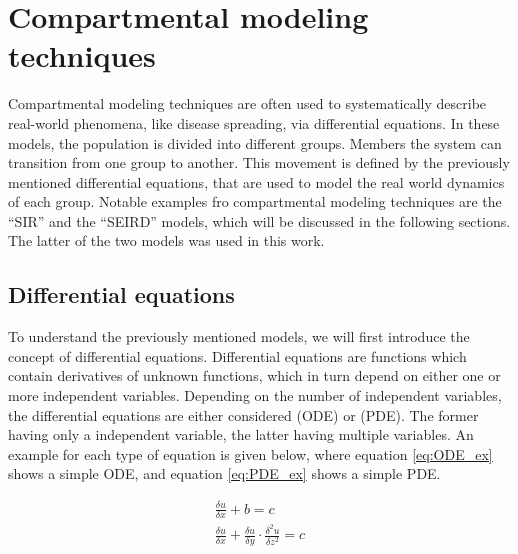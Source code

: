\section{Compartmental modeling techniques}
Compartmental modeling techniques are often used to systematically describe real-world phenomena,
like disease spreading, via differential equations\cite{kermack1991contributions,kendall1956deterministic}. In these models, the population is divided into different groups. 
Members the system can transition from one group to another. This movement is defined by the previously mentioned differential equations, that are used to model the real
world dynamics of each group. Notable examples fro compartmental modeling techniques are the ``SIR'' and the ``SEIRD'' models, which will be discussed in
the following sections. The latter of the two models was used in this work.


\subsection{Differential equations}
To understand the previously mentioned models, we will first introduce the concept of differential equations.
Differential equations are functions which contain derivatives of unknown functions, which in turn depend
on either one or more independent variables. Depending on the number of independent variables, the differential
equations are either considered  (ODE) or
 (PDE). The former having only a independent variable, the latter having multiple variables.
An example for each type of equation is given below, where equation \ref*{eq:ODE_ex} shows a simple ODE, and equation \ref*{eq:PDE_ex} shows a
simple PDE.\newline

\begin{align}
	\frac{\delta u}{\delta x} + b = c \label{eq:ODE_ex}\\
	\frac{\delta u}{\delta x} + \frac{\delta u}{\delta y} \cdot \frac{\delta^2 u}{\delta z^2} = c \label{eq:PDE_ex}
\end{align}

